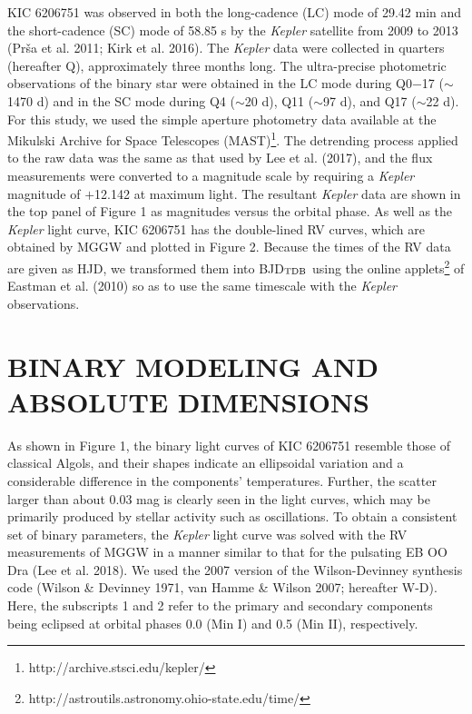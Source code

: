\documentclass[useAMS,usenatbib,usegraphicx]{mn2e}
\begin{document}
KIC 6206751 was observed in both the long-cadence (LC) mode of 29.42 min and the short-cadence (SC) mode of 58.85 s by 
the {\it Kepler} satellite from 2009 to 2013 (Pr\v sa et al. 2011; Kirk et al. 2016). The {\it Kepler} data were collected 
in quarters (hereafter Q), approximately three months long. The ultra-precise photometric observations of the binary star 
were obtained in the LC mode during Q0$-$17 ($\sim$1470 d) and in the SC mode during Q4 ($\sim$20 d), Q11 ($\sim$97 d), and 
Q17 ($\sim$22 d). For this study, we used the simple aperture photometry data available at the Mikulski Archive for Space 
Telescopes (MAST)\footnote{http://archive.stsci.edu/kepler/}. The detrending process applied to the raw data was the same 
as that used by Lee et al. (2017), and the flux measurements were converted to a magnitude scale by requiring a {\it Kepler} 
magnitude of $+$12.142 at maximum light. The resultant {\it Kepler} data are shown in the top panel of Figure 1 as magnitudes 
versus the orbital phase. As well as the {\it Kepler} light curve, KIC 6206751 has the double-lined RV curves, which are 
obtained by MGGW and plotted in Figure 2. Because the times of the RV data are given as HJD, we transformed them into 
BJD$_{\rm TDB}$ using the online applets\footnote{http://astroutils.astronomy.ohio-state.edu/time/} of Eastman et al. (2010) 
so as to use the same timescale with the {\it Kepler} observations.  


\section{BINARY MODELING AND ABSOLUTE DIMENSIONS}

As shown in Figure 1, the binary light curves of KIC 6206751 resemble those of classical Algols, and their shapes indicate 
an ellipsoidal variation and a considerable difference in the components' temperatures. Further, the scatter larger than 
about 0.03 mag is clearly seen in the light curves, which may be primarily produced by stellar activity such as oscillations. 
To obtain a consistent set of binary parameters, the {\it Kepler} light curve was solved with the RV measurements of MGGW 
in a manner similar to that for the pulsating EB OO Dra (Lee et al. 2018). We used the 2007 version of the Wilson-Devinney 
synthesis code (Wilson \& Devinney 1971, van Hamme \& Wilson 2007; hereafter W-D). Here, the subscripts 1 and 2 refer to 
the primary and secondary components being eclipsed at orbital phases 0.0 (Min I) and 0.5 (Min II), respectively.
\end{document}
